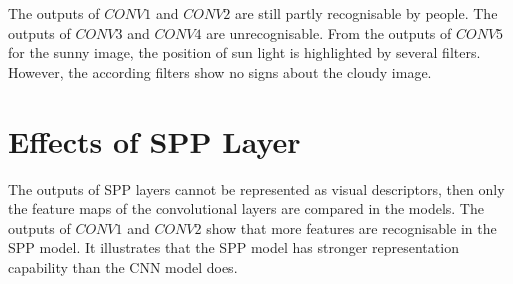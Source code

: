 The outputs of $CONV1$ and $CONV2$ are still partly recognisable by people. The outputs of $CONV3$ and $CONV4$ are unrecognisable. From the outputs of $CONV5$ for the sunny image, the position of sun light is highlighted by several filters. However, the according filters show no signs about the cloudy image.

\section{Effects of SPP Layer}

The outputs of SPP layers cannot be represented as visual descriptors, then only the feature maps of the convolutional layers are compared in the models. The outputs of $CONV1$ and $CONV2$ show that more features are recognisable in the SPP model. It illustrates that the SPP model has stronger representation capability than the CNN model does.
 
